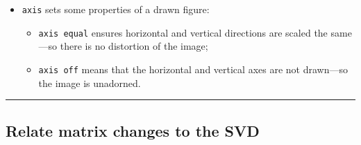 \begin{table}
\begin{minipage}{\linewidth}
\begin{itemize}




\item {}\verb|axis| sets some properties of a drawn figure:
\begin{itemize}
\item \verb|axis equal| ensures horizontal and vertical directions are scaled the same---so there is no distortion of the image;
\item \verb|axis off| means that the horizontal and vertical axes are not drawn---so the image is unadorned.
\end{itemize}


\end{itemize}
\end{minipage}
\hrule
\end{table}








\subsection{Relate matrix changes to the SVD}
\label{sec:rmmsvd}


